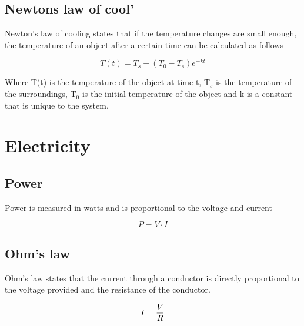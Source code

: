\documentclass[11pt,fleqn]{book} %
\begin{document}
\subsection{Newtons law of cool'}

Newton's law of cooling states that if the temperature changes are small enough, the temperature of an object after a certain time can be calculated as follows

\begin{equation}
T(t) = T_s + (T_0 - T_s) e^{-kt}
\end{equation}

Where T(t) is the temperature of the object at time t, T$_s$ is the temperature of the surroundings, T$_0$ is the initial temperature of the object and k is a constant that is unique to the system.

\section{Electricity}

\subsection{Power}

Power is measured in watts and is proportional to the voltage and current

\begin{equation}
P = V \cdot I
\end{equation}

\subsection{Ohm's law}

Ohm's law states that the current through a conductor is directly proportional to the voltage provided and the resistance of the conductor.

\begin{equation}
I = {V \over R}
\end{equation}
\end{document}
